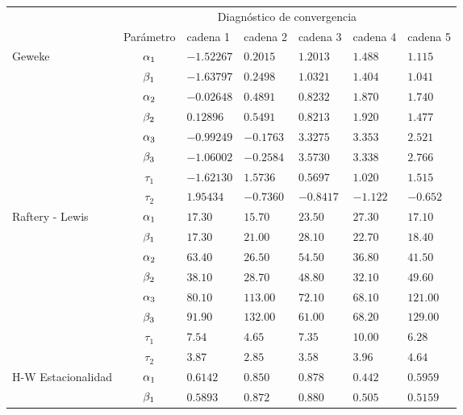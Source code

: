 \begin{table}[!h]
\centering
\begin{tabular}{|l|c|l|l|l|l|l|}
\hline
& \multicolumn{6}{|c|}{Diagnóstico de convergencia} \\
\cline{2-7}
& Parámetro & cadena 1  & cadena 2  & cadena 3 & cadena 4 & cadena 5	 \\
\hline \hline
\multirow{8}{2.5cm}{Geweke} & $\alpha_1$ & $-1.52267$ & $0.2015$ & $1.2013 $ & $ 1.488$  & $ 1.115$\\ \cline{2-7}
& $\beta_1$& $-1.63797 $ & $0.2498$ & $1.0321$ & $ 1.404$ & $ 1.041$\\
\cline{2-7}
& $\alpha_2$& $-0.02648 $ & $0.4891$ & $0.8232$ & $1.870$ & $ 1.740$\\
\cline{2-7}
& $\beta_2$& $0.12896 $ & $0.5491$ & $0.8213$ & $1.920$ & $1.477$\\
\cline{2-7}
& $\alpha_3$& $-0.99249 $ & $-0.1763$ & $3.3275$ & $3.353$ & $ 2.521$\\
\cline{2-7}
& $\beta_3$& $-1.06002$ & $-0.2584$ & $ 3.5730$ & $ 3.338$ & $2.766$\\
\cline{2-7}
& $\tau_1$& $-1.62130 $ & $1.5736$ & $0.5697$ & $  1.020$ & $1.515$\\
\cline{2-7}
& $\tau_2 $& $1.95434$ & $-0.7360$ & $-0.8417$ & $-1.122$ & $-0.652$\\
  \cline{1-7}
  \multirow{8}{2.5cm}{Raftery - Lewis} & $\alpha_1$ & $17.30 $ & $15.70 $ & $23.50  $ & $27.30$  & $ 17.10 $\\ \cline{2-7}
& $\beta_1$& $17.30 $ & $21.00 $ & $28.10$ & $22.70$ & $18.40 $\\
\cline{2-7}
& $\alpha_2$ & $ 63.40  $ & $26.50 $ & $54.50$ & $36.80$ & $41.50$\\
\cline{2-7}
& $\beta_2$ & $38.10  $ & $28.70 $ & $48.80$ & $32.10$ & $ 49.60$\\
\cline{2-7}
& $\alpha_3$ & $80.10  $ & $113.00$ & $72.10$ & $68.10$ & $121.00$\\
\cline{2-7}
& $\beta_3$ & $91.90  $ & $132.00 $ & $61.00$ & $68.20$ & $129.00$\\
\cline{2-7}
& $\tau_1$& $ 7.54 $ & $4.65$ & $7.35$ & $10.00$ & $ 6.28$\\
\cline{2-7}
& $\tau_2 $& $3.87 $ & $2.85$ & $3.58$ & $ 3.96 $ & $4.64$\\
  \cline{1-7}
  \multirow{8}{2.5cm}{H-W Estacionalidad} & $\alpha_1$ & $0.6142 $ & $0.850 $ & $ 0.878$ & $0.442$  & $0.5959 $\\ \cline{2-7}
& $\beta_1$& $0.5893  $ & $0.872   $ & $0.880$ & $0.505$ & $0.5159 $\\

\end{tabular}
\end{table}

